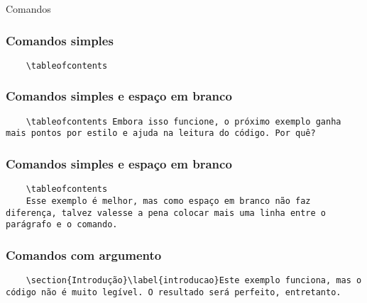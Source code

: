 \begin{frame}[standout]
  \Huge
  Comandos
\end{frame}

\begin{frame}[fragile]
  \frametitle{Comandos simples}
  \begin{verbatim}
    \tableofcontents
  \end{verbatim}
\end{frame}

\begin{frame}[fragile]
  \frametitle{Comandos simples e espaço em branco}
  \begin{verbatim}
    \tableofcontents Embora isso funcione, o próximo exemplo ganha mais pontos por estilo e ajuda na leitura do código. Por quê?
  \end{verbatim}
\end{frame}

\begin{frame}[fragile]
  \frametitle{Comandos simples e espaço em branco}
  \begin{verbatim}
    \tableofcontents
    Esse exemplo é melhor, mas como espaço em branco não faz diferença, talvez valesse a pena colocar mais uma linha entre o parágrafo e o comando.
  \end{verbatim}
\end{frame}

\begin{frame}[fragile]
  \frametitle{Comandos com argumento}
  \begin{verbatim}
    \section{Introdução}\label{introducao}Este exemplo funciona, mas o código não é muito legível. O resultado será perfeito, entretanto.
  \end{verbatim}
\end{frame}

\begin{frame}[standout]
  \Huge
\end{frame}
